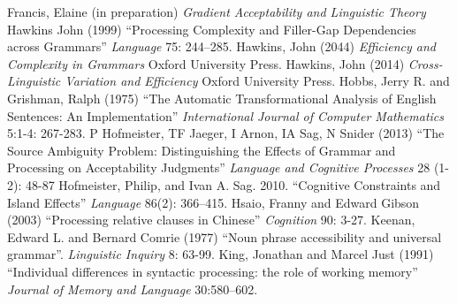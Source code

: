 \documentclass[a4paper]{article}
\begin{document}
\newline
\newline
Francis, Elaine (in preparation) {\it Gradient Acceptability and Linguistic Theory}
\newline
\newline
Hawkins John (1999) ``Processing Complexity and Filler-Gap Dependencies across Grammars'' {\it Language} 75:  244–285.
\newline
\newline
Hawkins, John (2044) {\it Efficiency and Complexity in Grammars}  Oxford University Press.
\newline
\newline
Hawkins, John (2014) {\it Cross-Linguistic Variation and Efficiency}  Oxford University Press.
\newline
\newline
Hobbs, Jerry R. and Grishman, Ralph (1975) ``The Automatic Transformational Analysis of English Sentences: An Implementation''  {\it International Journal of Computer Mathematics}
5:1-4: 267-283.
\newline
\newline
P Hofmeister, TF Jaeger, I Arnon, IA Sag, N Snider (2013) ``The Source Ambiguity Problem: Distinguishing the Effects of Grammar and Processing on Acceptability Judgments''
{\it Language and Cognitive Processes} 28 (1-2): 48-87
\newline
\newline
Hofmeister, Philip, and Ivan A. Sag. 2010. ``Cognitive Constraints and Island Effects''
{\it Language}
86(2): 366–415.
\newline
\newline
Hsaio, Franny and Edward Gibson (2003) ``Processing relative clauses in Chinese'' {\it Cognition} 90: 3-27.
\newline
\newline
Keenan, Edward L. and Bernard Comrie (1977) ``Noun phrase accessibility and universal grammar''. {\it Linguistic Inquiry} 8: 63-99.
\newline
\newline
King, Jonathan and Marcel Just  (1991) ``Individual differences in syntactic processing: the role of working memory'' {\it Journal of Memory and Language} 30:580–602.
\newline
\newline
\end{document}
